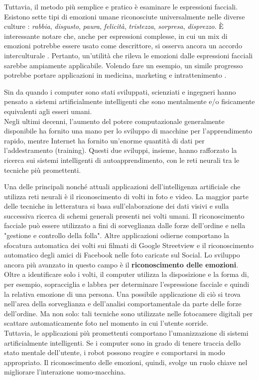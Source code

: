 Tuttavia, il metodo più semplice e pratico è esaminare le espressioni facciali. Esistono sette tipi di emozioni umane riconosciute universalmente nelle diverse culture \cite{article2}: \textit{rabbia}, \textit{disgusto}, \textit{paura}, \textit{felicità}, \textit{tristezza}, \textit{sorpresa}, \textit{disprezzo}. È interessante notare che, anche per espressioni complesse, in cui un mix di emozioni potrebbe essere usato come descrittore, si osserva ancora un accordo interculturale \cite{article3}. Pertanto, un'utilità che rileva le emozioni dalle espressioni facciali sarebbe ampiamente applicabile. Volendo fare un esempio, un simile progresso potrebbe portare applicazioni in medicina, marketing e intrattenimento \cite{article4}.

Sin da quando i computer sono stati sviluppati, scienziati e ingegneri hanno pensato a sistemi artificialmente intelligenti che sono mentalmente e/o fisicamente equivalenti agli esseri umani.\\ Negli ultimi decenni, l'aumento del potere computazionale generalmente disponibile ha fornito una mano per lo sviluppo di macchine per l'apprendimento rapido, mentre Internet ha fornito un'enorme quantità di dati per l'addestramento (training). Questi due sviluppi, insieme, hanno rafforzato la ricerca sui sistemi intelligenti di autoapprendimento, con le reti neurali tra le tecniche più promettenti.

Una delle principali nonché attuali applicazioni dell'intelligenza artificiale che utilizza reti neurali è il riconoscimento di volti in foto e video. La maggior parte delle tecniche in letteratura si basa sull'elaborazione dei dati visivi e sulla successiva ricerca di schemi generali presenti nei volti umani. Il riconoscimento facciale può essere utilizzato a fini di sorveglianza dalle forze dell'ordine e nella "gestione e controllo della folla". 
Altre applicazioni odierne comportano la sfocatura automatica dei volti sui filmati di Google Streetview e il riconoscimento automatico degli amici di Facebook nelle foto caricate sul Social. Lo sviluppo ancora più avanzato in questo campo è il \textbf{riconoscimento delle emozioni}. Oltre a identificare solo i volti, il computer utilizza la disposizione e la forma di, per esempio, sopracciglia e labbra per determinare l'espressione facciale e quindi la relativa emozione di una persona. Una possibile applicazione di ciò si trova nell'area della sorveglianza e dell'analisi comportamentale da parte delle forze dell'ordine. Ma non solo: tali tecniche sono utilizzate nelle fotocamere digitali per scattare automaticamente foto nel momento in cui l'utente sorride.\\
Tuttavia, le applicazioni più promettenti comportano l'umanizzazione di sistemi artificialmente intelligenti. Se i computer sono in grado di tenere traccia dello stato mentale dell'utente, i robot possono reagire e comportarsi in modo appropriato. Il riconoscimento delle emozioni, quindi, svolge un ruolo chiave nel migliorare l'interazione uomo-macchina.


